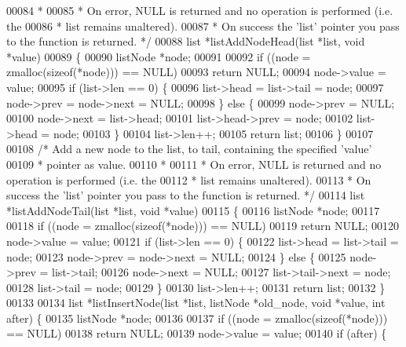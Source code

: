 \begin{DoxyCode}
00084 \textcolor{comment}{ *}
00085 \textcolor{comment}{ * On error, NULL is returned and no operation is performed (i.e. the}
00086 \textcolor{comment}{ * list remains unaltered).}
00087 \textcolor{comment}{ * On success the 'list' pointer you pass to the function is returned. */}
00088 list *listAddNodeHead(list *list, \textcolor{keywordtype}{void} *value)
00089 \{
00090     listNode *node;
00091 
00092     \textcolor{keywordflow}{if} ((node = zmalloc(\textcolor{keyword}{sizeof}(*node))) == NULL)
00093         \textcolor{keywordflow}{return} NULL;
00094     node->value = value;
00095     \textcolor{keywordflow}{if} (list->len == 0) \{
00096         list->head = list->tail = node;
00097         node->prev = node->next = NULL;
00098     \} \textcolor{keywordflow}{else} \{
00099         node->prev = NULL;
00100         node->next = list->head;
00101         list->head->prev = node;
00102         list->head = node;
00103     \}
00104     list->len++;
00105     \textcolor{keywordflow}{return} list;
00106 \}
00107 
00108 \textcolor{comment}{/* Add a new node to the list, to tail, containing the specified 'value'}
00109 \textcolor{comment}{ * pointer as value.}
00110 \textcolor{comment}{ *}
00111 \textcolor{comment}{ * On error, NULL is returned and no operation is performed (i.e. the}
00112 \textcolor{comment}{ * list remains unaltered).}
00113 \textcolor{comment}{ * On success the 'list' pointer you pass to the function is returned. */}
00114 list *listAddNodeTail(list *list, \textcolor{keywordtype}{void} *value)
00115 \{
00116     listNode *node;
00117 
00118     \textcolor{keywordflow}{if} ((node = zmalloc(\textcolor{keyword}{sizeof}(*node))) == NULL)
00119         \textcolor{keywordflow}{return} NULL;
00120     node->value = value;
00121     \textcolor{keywordflow}{if} (list->len == 0) \{
00122         list->head = list->tail = node;
00123         node->prev = node->next = NULL;
00124     \} \textcolor{keywordflow}{else} \{
00125         node->prev = list->tail;
00126         node->next = NULL;
00127         list->tail->next = node;
00128         list->tail = node;
00129     \}
00130     list->len++;
00131     \textcolor{keywordflow}{return} list;
00132 \}
00133 
00134 list *listInsertNode(list *list, listNode *old\_node, \textcolor{keywordtype}{void} *value, \textcolor{keywordtype}{int} after) \{
00135     listNode *node;
00136 
00137     \textcolor{keywordflow}{if} ((node = zmalloc(\textcolor{keyword}{sizeof}(*node))) == NULL)
00138         \textcolor{keywordflow}{return} NULL;
00139     node->value = value;
00140     \textcolor{keywordflow}{if} (after) \{

\end{DoxyCode}
